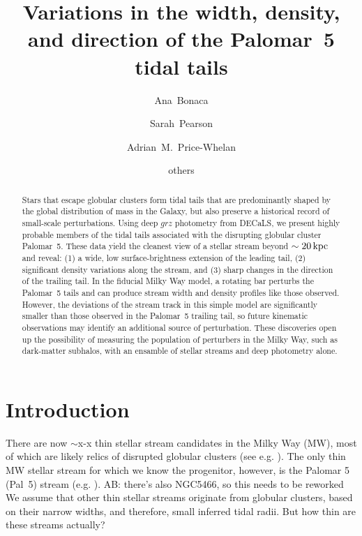 \documentclass[twocolumn]{aastex62}
\newcommand{\ab}[1]{{\color{red} AB: #1}}
\begin{document}
\sloppy\sloppypar\raggedbottom\frenchspacing %

\title{Variations in the width, density, and direction of the Palomar~5 tidal tails}

\author[0000-0002-7846-9787]{Ana~Bonaca}

\author[0000-0003-0256-5446]{Sarah~Pearson}

\author[0000-0003-0872-7098]{Adrian~M.~Price-Whelan}

\author{others}

\begin{abstract}\noindent %
Stars that escape globular clusters form tidal tails that are predominantly shaped by the global distribution of mass in the Galaxy, but also preserve a historical record of small-scale perturbations.
Using deep $grz$ photometry from DECaLS, we present highly probable members of the tidal tails associated with the disrupting globular cluster Palomar~5.
These data yield the cleanest view of a stellar stream beyond $\sim20\,\rm kpc$ and reveal: (1) a wide, low surface-brightness extension of the leading tail, (2) significant density variations along the stream, and (3) sharp changes in the direction of the trailing tail.
In the fiducial Milky Way model, a rotating bar perturbs the Palomar~5 tails and can produce stream width and density profiles like those observed.
However, the deviations of the stream track in this simple model are significantly smaller than those observed in the Palomar~5 trailing tail, so future kinematic observations may identify an additional source of perturbation.
These discoveries open up the possibility of measuring the population of perturbers in the Milky Way, such as dark-matter subhalos, with an ensamble of stellar streams and deep photometry alone.
\end{abstract}


\section{Introduction}
\label{sec:intro}
There are now $\sim$x-x thin stellar stream candidates in the Milky Way (MW), most of which are likely relics of disrupted globular clusters (see e.g. \citealt{Ibata:2019}).
The only thin MW stellar stream for which we know the progenitor, however, is the Palomar 5 (Pal~5) stream (e.g. \citealt{Odenkirchen:2001}). \ab{there's also NGC5466, so this needs to be reworked}
We assume that other thin stellar streams originate from globular clusters, based on their narrow widths, and therefore, small inferred tidal radii. But how thin are these streams actually?
\end{document}
